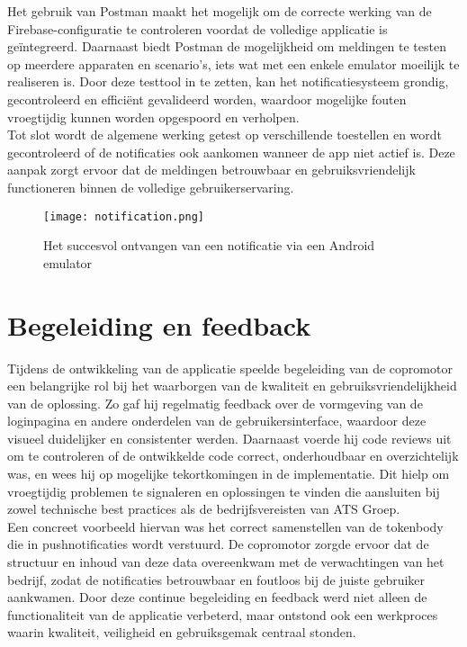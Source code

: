 Het gebruik van Postman maakt het mogelijk om de correcte werking van de Firebase-configuratie te controleren voordat de volledige applicatie is geïntegreerd. Daarnaast biedt Postman de mogelijkheid om meldingen te testen op meerdere apparaten en scenario's, iets wat met een enkele emulator moeilijk te realiseren is. Door deze testtool in te zetten, kan het notificatiesysteem grondig, gecontroleerd en efficiënt gevalideerd worden, waardoor mogelijke fouten vroegtijdig kunnen worden opgespoord en verholpen.\\

Tot slot wordt de algemene werking getest op verschillende toestellen en wordt gecontroleerd of de notificaties ook aankomen wanneer de app niet actief is. Deze aanpak zorgt ervoor dat de meldingen betrouwbaar en gebruiksvriendelijk functioneren binnen de volledige gebruikerservaring. \\

\begin{figure}[H]
    \centering
    \texttt{[image: notification.png]}
    \caption{Het succesvol ontvangen van een notificatie via een Android emulator}
    \label{fig:notification}
\end{figure}

\section{Begeleiding en feedback}

Tijdens de ontwikkeling van de applicatie speelde begeleiding van de copromotor een belangrijke rol bij het waarborgen van de kwaliteit en gebruiksvriendelijkheid van de oplossing. Zo gaf hij regelmatig feedback over de vormgeving van de loginpagina en andere onderdelen van de gebruikersinterface, waardoor deze visueel duidelijker en consistenter werden. Daarnaast voerde hij code reviews uit om te controleren of de ontwikkelde code correct, onderhoudbaar en overzichtelijk was, en wees hij op mogelijke tekortkomingen in de implementatie. Dit hielp om vroegtijdig problemen te signaleren en oplossingen te vinden die aansluiten bij zowel technische best practices als de bedrijfsvereisten van ATS Groep.\\

Een concreet voorbeeld hiervan was het correct samenstellen van de tokenbody die in pushnotificaties wordt verstuurd. De copromotor zorgde ervoor dat de structuur en inhoud van deze data overeenkwam met de verwachtingen van het bedrijf, zodat de notificaties betrouwbaar en foutloos bij de juiste gebruiker aankwamen. Door deze continue begeleiding en feedback werd niet alleen de functionaliteit van de applicatie verbeterd, maar ontstond ook een werkproces waarin kwaliteit, veiligheid en gebruiksgemak centraal stonden.\\

